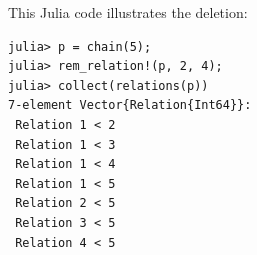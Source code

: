 \documentclass[12pt]{article}
\begin{document}
This Julia code illustrates the deletion:
\begin{verbatim}
julia> p = chain(5);
julia> rem_relation!(p, 2, 4);
julia> collect(relations(p))
7-element Vector{Relation{Int64}}:
 Relation 1 < 2
 Relation 1 < 3
 Relation 1 < 4
 Relation 1 < 5
 Relation 2 < 5
 Relation 3 < 5
 Relation 4 < 5
\end{verbatim}
\end{document}
